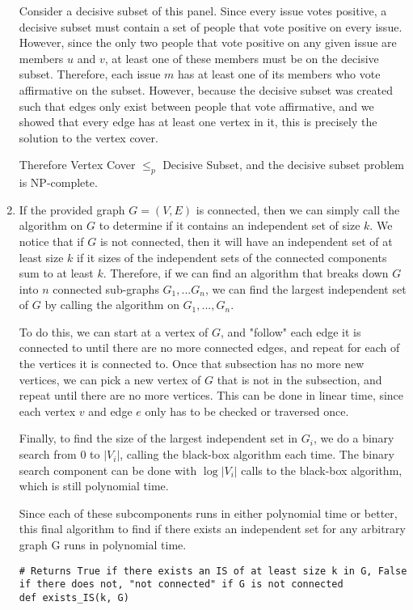 \documentclass[oneside, 12pt]{article}
\begin{document}
\begin{enumerate}
Consider a decisive subset of this panel. Since every issue votes positive, a decisive subset must contain a set of people that vote positive on every issue. However, since the only two people that vote positive on any given issue are members $u$ and $v$, at least one of these members must be on the decisive subset. Therefore, each issue $m$ has at least one of its members who vote affirmative on the subset. However, because the decisive subset was created such that edges only exist between people that vote affirmative, and we showed that every edge has at least one vertex in it, this is precisely the solution to the vertex cover.

Therefore Vertex Cover $\le_p$ Decisive Subset, and the decisive subset problem is NP-complete. 
\clearpage
\setcounter{enumi}{21}
\item
If the provided graph $G = (V, E)$ is connected, then we can simply call the algorithm on $G$ to determine if it contains an independent set of size $k$. We notice that if $G$ is not connected, then it will have an independent set of at least size $k$ if it sizes of the independent sets of the connected components sum to at least $k$. Therefore, if we can find an algorithm that breaks down $G$ into $n$ connected sub-graphs $G_1, ... G_n$, we can find the largest independent set of $G$ by calling the algorithm on $G_1,..., G_n$. 

To do this, we can start at a vertex of $G$, and "follow" each edge it is connected to until there are no more connected edges, and repeat for each of the vertices it is connected to. Once that subsection has no more new vertices, we can pick a new vertex of $G$ that is not in the subsection, and repeat until there are no more vertices. This can be done in linear time, since each vertex $v$ and edge $e$ only has to be checked or traversed once. 

Finally, to find the size of the largest independent set in $G_i$, we do a binary search from 0 to $|V_i|$, calling the black-box algorithm each time. The binary search component can be done with $\log |V_i|$ calls to the black-box algorithm, which is still polynomial time. 

Since each of these subcomponents runs in either polynomial time or better, this final algorithm to find if there exists an independent set for any arbitrary graph G runs in polynomial time.
\begin{lstlisting}
# Returns True if there exists an IS of at least size k in G, False if there does not, "not connected" if G is not connected
def exists_IS(k, G)


\end{lstlisting}
\end{enumerate}
\end{document}
